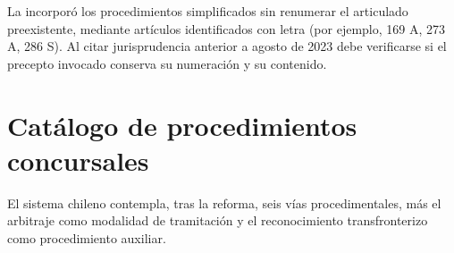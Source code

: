 \begin{alerta}
La \Lreforma{} incorporó los procedimientos simplificados sin renumerar el articulado
preexistente, mediante artículos identificados con letra (por ejemplo, 169 A, 273 A,
286 S). Al citar jurisprudencia anterior a agosto de 2023 debe verificarse si el precepto
invocado conserva su numeración y su contenido.
\end{alerta}

\section{Catálogo de procedimientos concursales}

El sistema chileno contempla, tras la reforma, seis vías procedimentales, más el
arbitraje como modalidad de tramitación y el reconocimiento transfronterizo como
procedimiento auxiliar.

